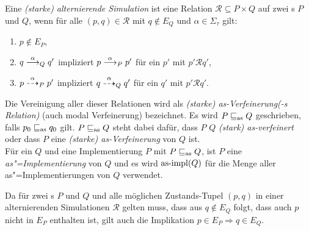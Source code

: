 \begin{Def}
  \label{SimDef}
  Eine \emph{(starke) alternierende Simulation} ist eine Relation
  $\mathcal{R}\subseteq P \times Q$ auf zwei \MEIO{}s $P$ und $Q$, wenn für
  alle $(p,q)\in \mathcal{R}$ mit $q\notin E_Q$ und $\alpha\in\Sigma _\tau$
  gilt:
  \begin{enumerate}
    \item $p\notin E_P$,
    \item $q\must[\alpha]_Q q'$ impliziert $p\must[\alpha]_P p'$ für ein $p'$
      mit $p'\mathcal{R}q'$,
    \item $p\may[\alpha]_P p'$ impliziert $q\may[\alpha]_Q q'$ für ein $q'$ mit
      $p'\mathcal{R}q'$.
  \end{enumerate}
  Die Vereinigung \asRel{} aller dieser Relationen wird als \emph{(starke)
  as-Verfeinerung(-s Relation)} (auch modal Verfeinerung) bezeichnet. Es wird
  $P\sqsubseteq _{\mathrm{as}} Q$ geschrieben, falls $p_0\sqsubseteq _{\mathrm{as}} q_0$ gilt. $P\sqsubseteq _{\mathrm{as}} Q$ steht dabei
  dafür, dass $P$ $Q$ \emph{(stark) as-verfeinert} oder dass $P$ eine
  \emph{(starke) as-Verfeinerung} von $Q$ ist.\\
  Für ein \MEIO{} $Q$ und eine Implementierung $P$ mit $P\sqsubseteq _{\mathrm{as}}{}Q$, ist
  $P$ eine \emph{as"=Implementierung} von $Q$ und es wird $\mathrm{as}\text{-}\mathrm{impl} (Q)$ für die
  Menge aller as"=Implementierungen von $Q$ verwendet.
\end{Def}

Da für zwei \MEIO{}s $P$ und $Q$ und alle möglichen Zustands-Tupel $(p,q)$ in
einer alternierenden Simulationen $\mathcal{R}$ gelten muss, dass aus $q\notin
E_Q$ folgt, dass auch $p$ nicht in $E_P$ enthalten ist, gilt auch die
Implikation $p\in E_P\Rightarrow q\in E_Q$.


